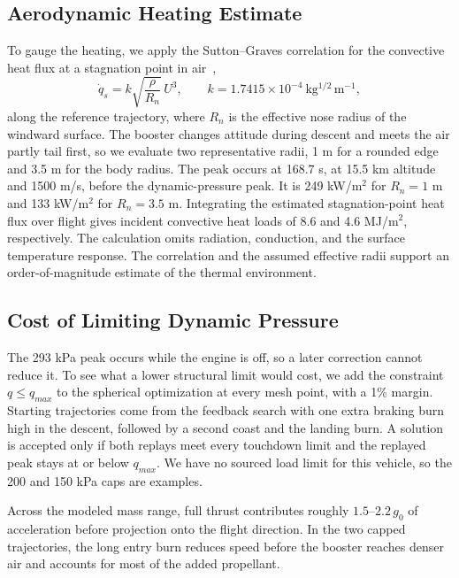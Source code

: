 \subsection{Aerodynamic Heating Estimate}
\label{sec:heating}
To gauge the heating, we apply the Sutton--Graves correlation for the convective heat flux at a stagnation point in air~\cite{suttonGraves},
\begin{equation}\label{eq:sutton}
 \dot q_s=k\sqrt{\frac{\rho}{R_n}}\,U^3,\qquad k=1.7415\times10^{-4}\ \mathrm{kg^{1/2}\,m^{-1}},
\end{equation}
along the reference trajectory, where $R_n$ is the effective nose radius of the windward surface. The booster changes attitude during descent and meets the air partly tail first, so we evaluate two representative radii, 1 m for a rounded edge and 3.5 m for the body radius. The peak occurs at 168.7 s, at 15.5 km altitude and 1500 m/s, before the dynamic-pressure peak. It is 249 kW/m$^2$ for $R_n=1$ m and 133 kW/m$^2$ for $R_n=3.5$ m. Integrating the estimated stagnation-point heat flux over flight gives incident convective heat loads of 8.6 and 4.6 MJ/m$^2$, respectively. The calculation omits radiation, conduction, and the surface temperature response. The correlation and the assumed effective radii support an order-of-magnitude estimate of the thermal environment.

\subsection{Cost of Limiting Dynamic Pressure}
\label{sec:qcap}
The 293 kPa peak occurs while the engine is off, so a later correction cannot reduce it. To see what a lower structural limit would cost, we add the constraint $q\le q_{max}$ to the spherical optimization at every mesh point, with a 1\% margin. Starting trajectories come from the feedback search with one extra braking burn high in the descent, followed by a second coast and the landing burn. A solution is accepted only if both replays meet every touchdown limit and the replayed peak stays at or below $q_{max}$. We have no sourced load limit for this vehicle, so the 200 and 150 kPa caps are examples.



Across the modeled mass range, full thrust contributes roughly $1.5$--$2.2\,g_0$ of acceleration before projection onto the flight direction. In the two capped trajectories, the long entry burn reduces speed before the booster reaches denser air and accounts for most of the added propellant.
